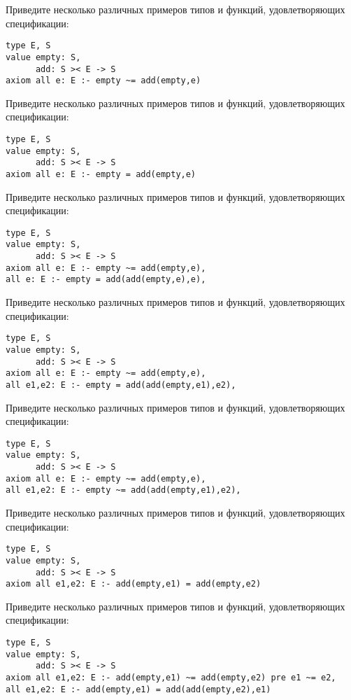 
\z Приведите несколько различных примеров типов и функций, удовлетворяющих спецификации:
\begin{lstlisting}
type E, S
value empty: S,
      add: S >< E -> S
axiom all e: E :- empty ~= add(empty,e)
\end{lstlisting}

\z Приведите несколько различных примеров типов и функций, удовлетворяющих спецификации:
\begin{lstlisting}
type E, S
value empty: S,
      add: S >< E -> S
axiom all e: E :- empty = add(empty,e)
\end{lstlisting}

\z Приведите несколько различных примеров типов и функций, удовлетворяющих спецификации:
\begin{lstlisting}
type E, S
value empty: S,
      add: S >< E -> S
axiom all e: E :- empty ~= add(empty,e),
all e: E :- empty = add(add(empty,e),e),
\end{lstlisting}

\z Приведите несколько различных примеров типов и функций, удовлетворяющих спецификации:
\begin{lstlisting}
type E, S
value empty: S,
      add: S >< E -> S
axiom all e: E :- empty ~= add(empty,e),
all e1,e2: E :- empty = add(add(empty,e1),e2),
\end{lstlisting}

\z Приведите несколько различных примеров типов и функций, удовлетворяющих спецификации:
\begin{lstlisting}
type E, S
value empty: S,
      add: S >< E -> S
axiom all e: E :- empty ~= add(empty,e),
all e1,e2: E :- empty ~= add(add(empty,e1),e2),
\end{lstlisting}

\z Приведите несколько различных примеров типов и функций, удовлетворяющих спецификации:
\begin{lstlisting}
type E, S
value empty: S,
      add: S >< E -> S
axiom all e1,e2: E :- add(empty,e1) = add(empty,e2)
\end{lstlisting}

\z Приведите несколько различных примеров типов и функций, удовлетворяющих спецификации:
\begin{lstlisting}
type E, S
value empty: S,
      add: S >< E -> S
axiom all e1,e2: E :- add(empty,e1) ~= add(empty,e2) pre e1 ~= e2,
all e1,e2: E :- add(empty,e1) = add(add(empty,e2),e1)
\end{lstlisting}


